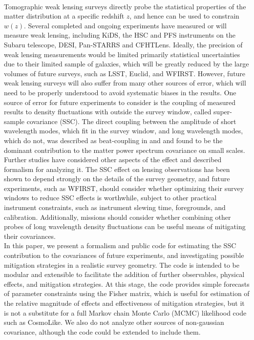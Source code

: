 \documentclass[a4paper,11pt]{article}
\begin{document}
\\
Tomographic weak lensing surveys directly probe the statistical properties of the matter distribution at a specific redshift $z$, and hence can be used to constrain $w(z)$\cite{weinberg_probes}\cite{huterer_wl}. Several completed and ongoing experiments have measured or will measure weak lensing, including KiDS\cite{kids}, the HSC\cite{hsc-wl} and PFS\cite{suprime_pfs} instruments on the Subaru telescope, DESI\cite{desi}, Pan-STARRS\cite{panstarrs} and CFHTLens\cite{cfhtlens}. Ideally, the precision of weak lensing measurements would be limited primarily statistical uncertainties due to their limited sample of galaxies, which will be greatly reduced by the large volumes of future surveys, such as LSST\cite{lsst}, Euclid\cite{euclid}, and WFIRST\cite{wfirst}. However, future weak lensing surveys will also suffer from many other sources of error, which will need to be properly understood to avoid systematic biases in the results\cite{schaan_shear_calibration}\cite{systematic_lensing_mandelbaum}\cite{systematic_lensing_massey}\cite{systematic_lensing_huterer}. One source of error for future experiments to consider is the coupling of measured results to density fluctuations with outside the survey window, called super-sample covariance (SSC).  The direct coupling between the amplitude of short wavelength modes, which fit in the survey window, and long wavelength modes, which do not, was described as beat-coupling in \cite{hamilton_ssc_orig1} and \cite{hamilton_ssc_orig2} and found to be the dominant contribution to the matter power spectrum covariance on small scales. Further studies have considered other aspects of the effect and described formalism for analyzing it\cite{lihu_ssc_signal}\cite{lihu_ssc_sim}\cite{takadahu_ssc}\cite{cov_jackknife}\cite{takadaspergel_ssc}\cite{deputter_ssc}. The SSC effect on lensing observations has been shown to depend strongly on the details of the survey geometry\cite{geom_wl_ssc}, and future experiments, such as WFIRST, should consider whether optimizing their survey windows to reduce SSC effects is worthwhile, subject to other practical instrument constraints, such as instrument slewing time, foregrounds, and calibration. Additionally, missions should consider whether combining other probes of long wavelength density fluctuations can be useful means of mitigating their covariances\cite{krause_eifler_cosmolike}\cite{eifler_krause_cosmolike}. 
\\
In this paper, we present a formalism and public code for estimating the SSC contribution to the covariances of future experiments, and investigating possible mitigation strategies in a realistic survey geometry. The code is intended to be modular and extensible to facilitate the addition of further observables, physical effects, and mitigation strategies. At this stage, the code provides simple forecasts of parameter constraints using the Fisher matrix, which is useful for estimation of the relative magnitude of effects and effectiveness of mitigation strategies, but it is not a substitute for a full Markov chain Monte Carlo (MCMC) likelihood code such as CosmoLike\cite{krause_eifler_cosmolike}\cite{eifler_krause_cosmolike}. We also do not analyze other sources of non-gaussian covariance, although the code could be extended to include them.
\end{document}
